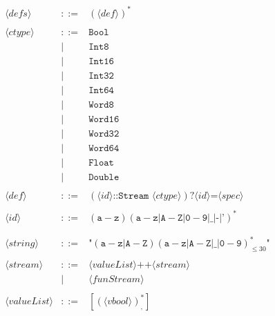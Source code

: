 \documentclass[11pt]{article}
\begin{document}
$$ \begin{array}{lcl}
\langle defs \rangle & ::= & (\langle def \rangle)^* \\
 & & \\
\langle ctype \rangle & ::= & \texttt{Bool} \\  
    & | & \texttt{Int8} \\
    & | & \texttt{Int16} \\ 
    & | & \texttt{Int32} \\
    & | & \texttt{Int64} \\
    & | & \texttt{Word8} \\ 
    & | & \texttt{Word16} \\
    & | & \texttt{Word32} \\
    & | & \texttt{Word64} \\
    & | & \texttt{Float} \\
    & | & \texttt{Double} \\
 & & \\
\langle def \rangle & ::= & (\langle id \rangle \texttt{::} \texttt{Stream } \langle ctype \rangle)? \langle id \rangle \texttt{=}\langle spec \rangle \\
 & & \\
\langle id \rangle & ::= & (\texttt{a}-\texttt{z})(\texttt{a}-\texttt{z}|\texttt{A}-\texttt{Z}|\texttt{0}-\texttt{9}|\_|\texttt{-}|\texttt{'})^* \\
 & & \\
 & & \\
\langle string \rangle & ::= & \texttt{"}(\texttt{a}-\texttt{z}|\texttt{A}-\texttt{Z})(\texttt{a}-\texttt{z}|\texttt{A}-\texttt{Z}|\texttt{\_}|\texttt{0}-\texttt{9})_{\leq 30}^*\texttt{"} \\
 & & \\
\langle stream \rangle & ::= & \langle valueList \rangle \texttt{++} \langle stream \rangle \\
    & | & \langle funStream \rangle \\ 
& & \\ 
\langle valueList \rangle & ::= & [(\langle vbool \rangle)_,^*] \\

\end{array}$$
\end{document}
